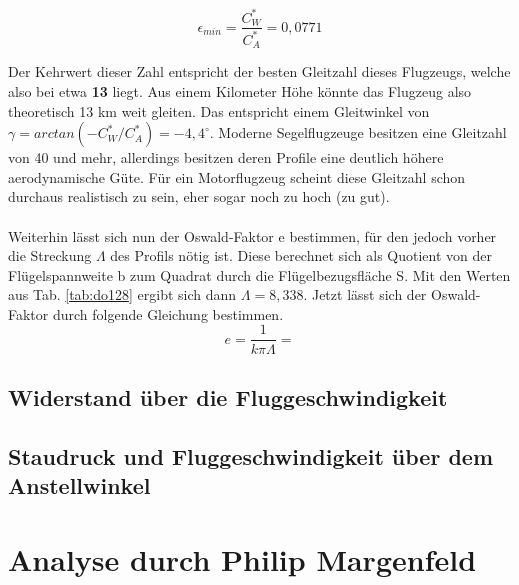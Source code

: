 \begin{equation}
\epsilon_{min}=\frac{C_W^*}{C_A^*}=0,0771
\end{equation}

\vspace{3mm} \noindent
Der Kehrwert dieser Zahl entspricht der besten Gleitzahl dieses Flugzeugs, welche also bei etwa \textbf{13} liegt. Aus einem Kilometer Höhe könnte das Flugzeug also theoretisch 13 km weit gleiten. Das entspricht einem Gleitwinkel von $\gamma =arctan(-C_W^*/C_A^*)=-4,4^\circ$. Moderne Segelflugzeuge besitzen eine Gleitzahl von 40 und mehr, allerdings besitzen deren Profile eine deutlich höhere aerodynamische Güte. Für ein Motorflugzeug scheint diese Gleitzahl schon durchaus realistisch zu sein, eher sogar noch zu hoch (zu gut).\\\\
Weiterhin lässt sich nun der Oswald-Faktor e bestimmen, für den jedoch vorher die Streckung $\Lambda$ des Profils nötig ist. Diese berechnet sich als Quotient von der Flügelspannweite b zum Quadrat durch die Flügelbezugsfläche S. Mit den Werten aus Tab. \ref{tab:do128} ergibt sich dann $\Lambda=8,338$. Jetzt lässt sich der Oswald-Faktor durch folgende Gleichung bestimmen.\\

\begin{equation}  
e=\frac{1}{k\pi \Lambda}=
\end{equation}

\vspace{3mm} \noindent


\subsection{Widerstand über die Fluggeschwindigkeit}
\subsection{Staudruck und Fluggeschwindigkeit über dem Anstellwinkel}
\newpage

\section{Analyse durch Philip Margenfeld}
